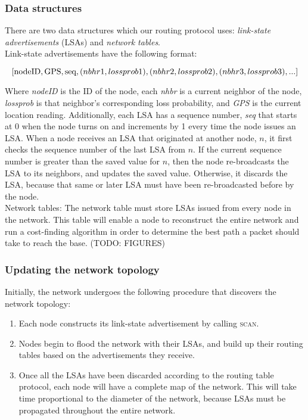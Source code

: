 \documentclass[letterpaper]{article}
\begin{document}
\subsubsection{Data structures}

\noindent There are two data structures which our routing protocol uses: \emph{link-state advertisements} 
(LSAs) and \emph{network tables}. 
\\

\noindent Link-state advertisements have the following format:

$$ [\textnormal{nodeID}, \textnormal{GPS}, \textnormal{seq}, (nbhr1, lossprob1), 
(nbhr2, lossprob2), (nbhr3, lossprob3), ...] $$

\noindent Where \emph{nodeID} is the ID of the node, each \emph{nhbr} is a current neighbor of the node,
\emph{lossprob} is that neighbor's corresponding loss probability, and \emph{GPS} is the current location
reading. Additionally, each LSA has a sequence number, \emph{seq} that starts at 0 when the node turns on
and increments by 1 every time the node issues an LSA. When a node receives an LSA that originated at another
node, $n$, it first checks the sequence number of the last LSA from $n$. If the current sequence number is 
greater than the saved value for $n$, then the node re-broadcasts the LSA to its neighbors, and updates the 
saved value. Otherwise, it discards the LSA, because that same or later LSA must have been re-broadcasted 
before by the node. 
\\

\noindent Network tables: The network table must store LSAs issued from every node in the network. This
table will enable a node to reconstruct the entire network and run a cost-finding algorithm in order to
determine the best path a packet should take to reach the base. (TODO: FIGURES)
\\

\subsubsection{Updating the network topology}

\noindent Initially, the network undergoes the following procedure that discovers the network topology:

\begin{enumerate}
  \item Each node constructs its link-state advertisement by calling \textsc{scan}. 
  \item Nodes begin to flood the network with their LSAs, and build up their routing tables based on
  the advertisements they receive.
  \item Once all the LSAs have been discarded according to the routing table protocol, each node will have
  a complete map of the network. This will take time proportional to the diameter of the network, because
  LSAs must be propagated throughout the entire network.
\end{enumerate}
\end{document}
